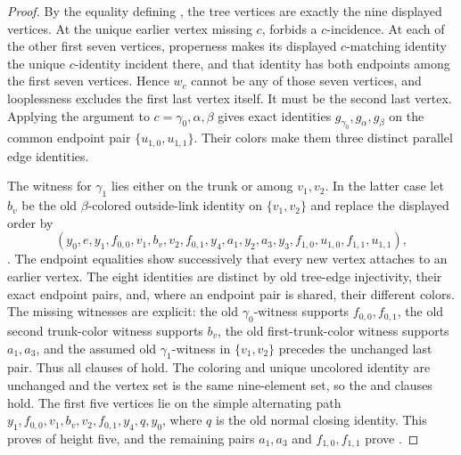\begin{proof}
By the equality defining , the tree
vertices are exactly the nine displayed vertices.  At the unique earlier
vertex missing $c$,  forbids a $c$-incidence.  At
each of the other first seven vertices, properness makes its displayed
$c$-matching identity the unique $c$-identity incident there, and that
identity has both endpoints among the first seven vertices.  Hence $w_c$
cannot be any of those seven vertices, and looplessness excludes the
first last vertex itself.  It must be the second last vertex.  Applying
the argument to $c=\gamma_0,\alpha,\beta$ gives exact identities
$g_{\gamma_0},g_\alpha,g_\beta$ on the common endpoint pair
$\{u_{1,0},u_{1,1}\}$.  Their colors make them three distinct parallel
edge identities.

The witness for $\gamma_1$ lies either on the trunk or among
$v_1,v_2$.  In the latter case let $b_v$ be the old $\beta$-colored
outside-link identity on $\{v_1,v_2\}$ and replace the displayed order by
\[
 (y_0,e,y_1,f_{0,0},v_1,b_v,v_2,f_{0,1},y_4,
   a_1,y_2,a_3,y_3,f_{1,0},u_{1,0},f_{1,1},u_{1,1}),
\].
The endpoint equalities show successively that every new vertex attaches
to an earlier vertex.  The eight identities are distinct by old tree-edge
injectivity, their exact endpoint pairs, and, where an endpoint pair is
shared, their different colors.  The missing witnesses are explicit: the
old $\gamma_0$-witness supports $f_{0,0},f_{0,1}$, the old second
trunk-color witness supports $b_v$, the old first-trunk-color witness
supports $a_1,a_3$, and the assumed old $\gamma_1$-witness in
$\{v_1,v_2\}$ precedes the unchanged last pair.  Thus all clauses of
 hold.  The coloring and unique uncolored identity
are unchanged and the vertex set is the same nine-element set, so the
 and  clauses hold.  The
first five vertices lie on the simple alternating path
$y_1,f_{0,0},v_1,b_v,v_2,f_{0,1},y_4,q,y_0$, where $q$ is the old normal
closing identity.  This proves  of
height five, and the remaining pairs $a_1,a_3$ and $f_{1,0},f_{1,1}$
prove .


\end{proof}
